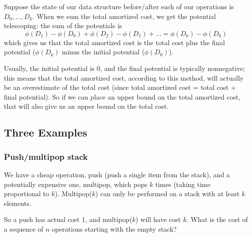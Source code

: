 \documentclass{article}
\begin{document}
\begin{enumerate}
	Suppose the state of our data structure before/after each of 
	our operations is $D_0, \ldots, D_k$.
	When we sum the total amortized cost, we get the potential telescoping: 
	the sum
	of the potentials is 
	$$
	\phi(D_1) - \phi(D_0) + \phi(D_2) - \phi (D_1) + \ldots
	= \phi(D_k) - \phi(D_0)
	$$
	which gives us that the total amortized cost is the
	total cost plus the final potential ($\phi(D_k)$ minus the initial potential ($\phi(D_0)$).
	
	Usually, the initial potential is $0$, and the final potential is
	typically nonnegative; this means that the total amortized cost,
	according to this method, will actually be an overestimate of the
	total cost (since total amortized cost = total cost + final potential).
	So if we can place an upper bound on the total amortized cost, that will
	also give us an upper bound on the total cost.
	
\end{enumerate}




\subsection{Three Examples}

\subsubsection{Push/multipop stack}

We have a cheap operation, push (push a single item from the stack),
and a potentially expensive one, multipop, which pops $k$ times 
(taking time proportional to $k$).
Multipop($k$) can only be performed on a stack with at least $k$ elements.

So a push has actual cost $1$, and multipop($k$) will have cost $k$.
What is the cost of a sequence of $n$ operations starting with
the empty stack?
\end{document}
